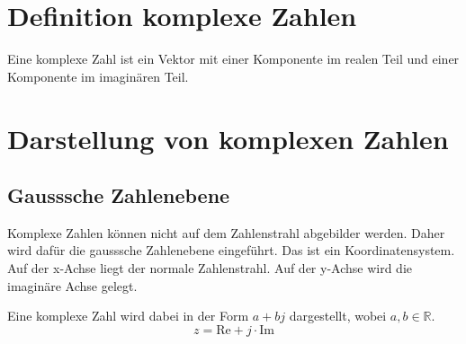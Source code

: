 



\section{Definition komplexe Zahlen}
\label{sec:komp}
Eine komplexe Zahl ist ein Vektor mit einer Komponente im realen Teil und 
einer Komponente im imaginären Teil. 

\section{Darstellung von komplexen Zahlen}
\subsection{Gausssche Zahlenebene}
Komplexe Zahlen können nicht auf dem Zahlenstrahl abgebilder werden. Daher wird 
dafür die gausssche Zahlenebene eingeführt. Das ist ein Koordinatensystem. Auf 
der x-Achse liegt der normale Zahlenstrahl. Auf der y-Achse wird die imaginäre 
Achse gelegt. 
\begin{center}
\end{center}
Eine komplexe Zahl wird dabei in der Form $a+bj$ dargestellt, wobei 
$a, b \in \mathbb{R}$. 
\[ z = \text{Re} + j \cdot \text{Im} \]
\newpage

